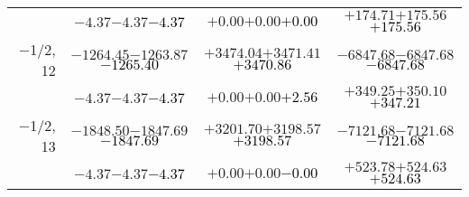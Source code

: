 \documentclass[compress]{beamer}
\begin{document}
\begin{frame}
{\begin{tabular}{r | c | c | c}
           & $-4.37$\hspace{0.1 cm}$-4.37$\hspace{0.1 cm}\textcolor{black}{$-4.37$} & $+0.00$\hspace{0.1 cm}$+0.00$\hspace{0.1 cm}\textcolor{black}{$+0.00$} & $+174.71$\hspace{0.1 cm}$+175.56$\hspace{0.1 cm}\textcolor{black}{$+175.56$} \\
$-$1/2, 12 & $-1264.45$\hspace{0.1 cm}$-1263.87$\hspace{0.1 cm}\textcolor{black}{$-1265.40$} & $+3474.04$\hspace{0.1 cm}$+3471.41$\hspace{0.1 cm}\textcolor{black}{$+3470.86$} & $-6847.68$\hspace{0.1 cm}$-6847.68$\hspace{0.1 cm}\textcolor{black}{$-6847.68$} \\
           & $-4.37$\hspace{0.1 cm}$-4.37$\hspace{0.1 cm}\textcolor{black}{$-4.37$} & $+0.00$\hspace{0.1 cm}$+0.00$\hspace{0.1 cm}\textcolor{black}{$+2.56$} & $+349.25$\hspace{0.1 cm}$+350.10$\hspace{0.1 cm}\textcolor{black}{$+347.21$} \\
$-$1/2, 13 & $-1848.50$\hspace{0.1 cm}$-1847.69$\hspace{0.1 cm}\textcolor{black}{$-1847.69$} & $+3201.70$\hspace{0.1 cm}$+3198.57$\hspace{0.1 cm}\textcolor{black}{$+3198.57$} & $-7121.68$\hspace{0.1 cm}$-7121.68$\hspace{0.1 cm}\textcolor{black}{$-7121.68$} \\
           & $-4.37$\hspace{0.1 cm}$-4.37$\hspace{0.1 cm}\textcolor{black}{$-4.37$} & $+0.00$\hspace{0.1 cm}$+0.00$\hspace{0.1 cm}\textcolor{black}{$-0.00$} & $+523.78$\hspace{0.1 cm}$+524.63$\hspace{0.1 cm}\textcolor{black}{$+524.63$} \\

\end{tabular}}
\end{frame}
\end{document}
